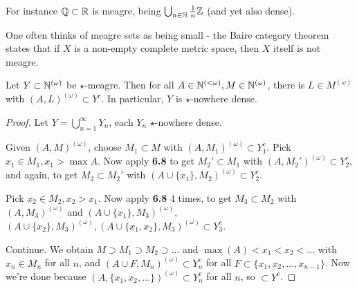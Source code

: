 \documentclass[10pt,a4paper]{article}
\begin{document}
For instance $\mathbb{Q} \subset \mathbb{R}$ is meagre, being $\bigcup_{n \in \mathbb{N}}\frac{1}{n}\mathbb{Z}$ (and yet also dense).

One often thinks of meagre sets as being small - the Baire category theorem states that if $X$ is a non-empty complete metric space, then $X$ itself is not meagre.
\begin{theorem}
  Let $Y \subset \mathbb{N}^{(\omega)}$ be $\star$-meagre. Then for all $A \in \mathbb{N}^{(<\omega)}, M\in \mathbb{N}^{(\omega)}$, there is $L \in M^{(\omega)}$ with $(A,L)^{(\omega)} \subset Y^c$. In particular, $Y$ is $\star$-nowhere dense.
\end{theorem}
\begin{proof}
  Let $Y = \bigcup_{n=1}^\infty Y_n$, each $Y_n$ $\star$-nowhere dense.

  Given $(A,M)^{(\omega)}$, choose $M_1 \subset M$ with $(A, M_1)^{(\omega)}\subset Y_1^c$. Pick $x_1 \in M_1, x_1> \max A$. Now apply \textbf{6.8} to get $M_2'\subset M_1$ with $(A,M_2')^{(\omega)}\subset Y_2^c$, and again, to get $M_2 \subset M_2'$ with $(A\cup \{x_1\}, M_2)^{(\omega)} \subset Y_2^c$.

  Pick $x_2 \in M_2, x_2 > x_1$. Now apply \textbf{6.8} 4 times, to get $M_3 \subset M_2$ with $(A,M_3)^{(\omega)}$ and $(A\cup \{x_1\}, M_3)^{(\omega)}$, $(A\cup\{x_2\}, M_3)^{(\omega)}, (A\cup\{x_1,x_2\}, M_3)^{(\omega)} \subset Y_3^c$.

  Continue. We obtain $M \supset M_1 \supset M_2 \supset \ldots$ and $\max(A) < x_1 < x_2 < \ldots$ with $x_n \in M_n$ for all $n$, and $(A\cup F, M_n)^{(\omega)} \subset Y_n^c$ for all $F \subset \{x_1, x_2, \ldots, x_{n-1}\}$. Now we're done because $(A, \{x_1, x_2, \ldots\})^{(\omega)} \subset Y_n^c$ for all $n$, so $\subset Y^c$.
\end{proof}
\end{document}

